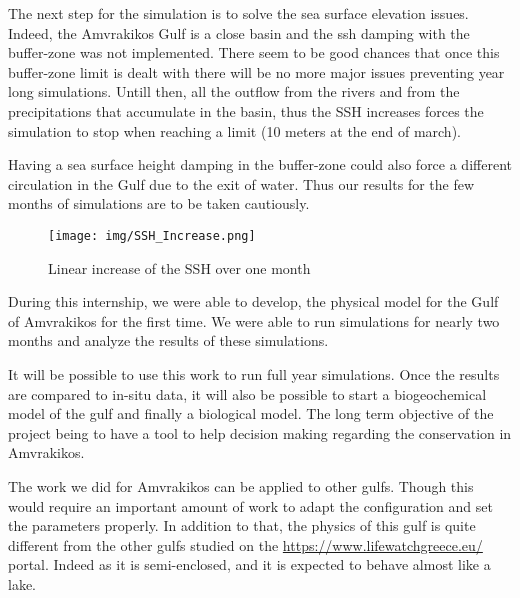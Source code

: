 \documentclass[english]{PFeENSTA}
\begin{document}
The next step for the simulation is to solve the sea surface elevation issues. Indeed, the Amvrakikos Gulf is a close basin and the ssh damping with the buffer-zone was not implemented. There seem to be good chances that once this buffer-zone limit is dealt with there will be no more major issues preventing year long simulations.
Untill then, all the outflow from the rivers and from the precipitations that accumulate in the basin, thus the SSH increases forces the simulation to stop when reaching a limit (10 meters at the end of march).

Having a sea surface height damping in the buffer-zone could also force a different circulation in the Gulf due to the exit of water. Thus our results for the few months of simulations are to be taken cautiously.

\begin{figure}[H]
   \centering
   \texttt{[image: img/SSH\_Increase.png]}
  \caption{\label{fig:SSH_Increase}Linear increase of the SSH over one month}
\end{figure}





During this internship, we were able to develop, the physical model for the Gulf of Amvrakikos for the first time. We were able to run simulations for nearly two months and analyze the results of these simulations. 

It will be possible to use this work to run full year simulations. Once the results are compared to in-situ data, it will also be possible to start a biogeochemical model of the gulf and finally a biological model. The long term objective of the project being to have a tool to help decision making regarding the conservation in Amvrakikos. 


The work we did for Amvrakikos can be applied to other gulfs. Though this would require an important amount of work to adapt the configuration and set the parameters properly. In addition to that, the physics of this gulf is quite different from the other gulfs studied on the \url{https://www.lifewatchgreece.eu/} portal. Indeed as it is semi-enclosed, and it is expected to behave almost like a lake.
\end{document}
